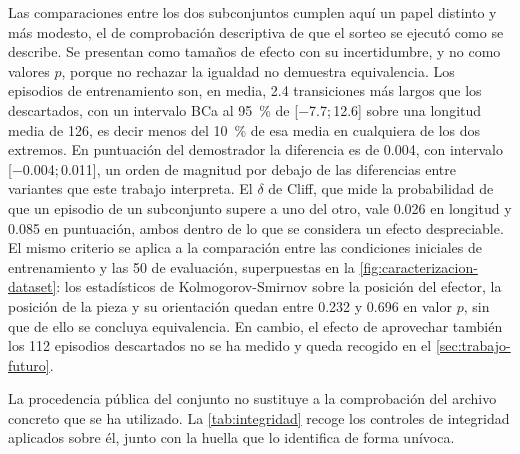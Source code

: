 Las comparaciones entre los dos subconjuntos cumplen aqu\'i un papel distinto y m\'as
modesto, el de comprobaci\'on descriptiva de que el sorteo se ejecut\'o como se describe.
Se presentan como tama\~nos de efecto con su incertidumbre, y no como valores $p$, porque
no rechazar la igualdad no demuestra equivalencia. Los episodios de entrenamiento son, en
media, \num{2.4} transiciones m\'as largos que los descartados, con un intervalo BCa al
\SI{95}{\percent} de {[\num{-7.7};\,\num{12.6}]} sobre una longitud media de \num{126}, es
decir menos del \SI{10}{\percent} de esa media en cualquiera de los dos extremos. En
puntuaci\'on del demostrador la diferencia es de \num{0.004}, con intervalo
{[\num{-0.004};\,\num{0.011}]}, un orden de magnitud por debajo de las diferencias entre
variantes que este trabajo interpreta. El $\delta$ de Cliff, que mide la probabilidad de
que un episodio de un subconjunto supere a uno del otro, vale \num{0.026} en longitud y
\num{0.085} en puntuaci\'on, ambos dentro de lo que se considera un efecto despreciable.
El mismo criterio se aplica a la comparaci\'on entre las condiciones iniciales de
entrenamiento y las \num{50} de evaluaci\'on, superpuestas en la
\cref{fig:caracterizacion-dataset}: los estad\'isticos de Kolmogorov-Smirnov sobre la
posici\'on del efector, la posici\'on de la pieza y su orientaci\'on quedan entre
\num{0.232} y \num{0.696} en valor $p$, sin que de ello se concluya equivalencia. En
cambio, el efecto de aprovechar tambi\'en los \num{112} episodios descartados no se ha
medido y queda recogido en el \cref{sec:trabajo-futuro}.

La procedencia p\'ublica del conjunto no sustituye a la comprobaci\'on del archivo
concreto que se ha utilizado. La \cref{tab:integridad} recoge los controles de integridad
aplicados sobre \'el, junto con la huella que lo identifica de forma un\'ivoca.

